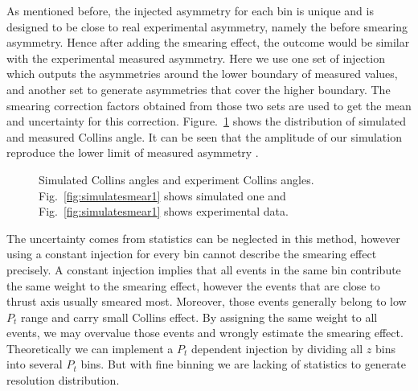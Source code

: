 As mentioned before, the injected asymmetry for each bin is unique and is designed to be close to real experimental asymmetry, namely the before smearing asymmetry. Hence after adding the smearing effect, the outcome would be similar with the experimental measured asymmetry.  Here we use one set of injection which outputs the asymmetries around the lower boundary of measured values, and another set to generate asymmetries that cover the higher boundary. The smearing correction factors obtained from those two sets are used to get the mean and uncertainty for this correction. Figure.~\ref{fig:simulatesmear} shows the distribution of simulated and measured Collins angle. It can be seen that the amplitude of our simulation reproduce the lower limit of measured asymmetry .
\begin{figure}[H]
 \centering     
  \caption{Simulated Collins angles and experiment Collins angles. Fig.~\ref{fig:simulatesmear1} shows simulated one and Fig.~\ref{fig:simulatesmear1} shows experimental data. }
  \label{fig:simulatesmear}
\end{figure}

The uncertainty comes from statistics can be neglected in this method, however using a constant injection for every bin cannot describe the smearing effect precisely. A constant injection implies that all events in the same bin contribute the same weight to the smearing effect, however the events that are close to thrust axis usually smeared most. Moreover, those events generally belong to low $P_t$ range and carry small Collins effect. By assigning the same weight to all events, we may overvalue those events and wrongly estimate the smearing effect. Theoretically we can implement a $P_t$ dependent injection by dividing all $z$ bins into several $P_t$ bins. But with fine binning we are lacking of statistics to generate resolution distribution. 



